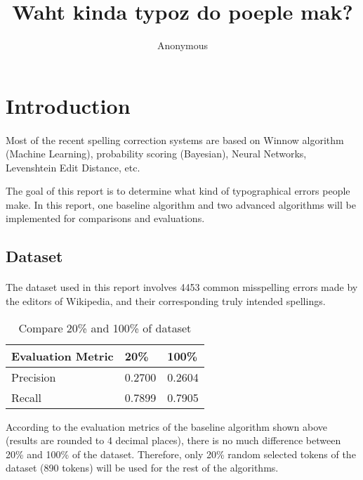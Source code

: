 \documentclass[11pt]{article}
\title{Waht kinda typoz do poeple mak?}
\author
{Anonymous}
\begin{document}
\maketitle

\section{Introduction}

\paragraph{} 

Most of the recent spelling correction systems are based on Winnow algorithm (Machine Learning), probability scoring (Bayesian), Neural Networks, Levenshtein Edit Distance, etc. 

The goal of this report is to determine what kind of typographical errors people make. In this report, one baseline algorithm and two advanced algorithms will be implemented for comparisons and evaluations.

\subsection{Dataset}

\paragraph{} The dataset used in this report involves 4453 common misspelling errors made by the editors of Wikipedia\cite{WikiMisspell}, and their corresponding truly intended spellings.

\begin{table}[h]
 \begin{center}
\begin{tabular}{| l | l | l |}

      \hline
      Evaluation Metric & 20\% & 100\% \\
      \hline\hline
      Precision & 0.2700 & 0.2604 \\
      Recall & 0.7899 & 0.7905 \\
      \hline

\end{tabular}
\caption{Compare 20\% and 100\% of dataset}\label{table1}
 \end{center}
\end{table}

According to the evaluation metrics of the baseline algorithm shown above (results are rounded to 4 decimal places), there is no much difference between 20\% and 100\% of the dataset. Therefore, only 20\% random selected tokens of the dataset (890 tokens) will be used for the rest of the algorithms.
\end{document}
